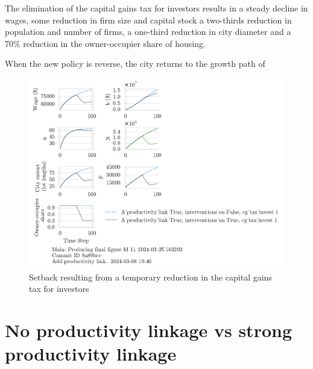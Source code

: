 The elimination of the capital gains tax for investors results in a steady decline in wages, some reduction in firm size and capital stock a two-thirds reduction in population and number of firms,  a one-third reduction in city diameter and a 70\% reduction in the owner-occupier share of housing.

When the new policy is reverse, the city returns to  the growth path of 

\begin{figure}[h!tb] 
    \centering
    \includegraphics[scale=1.15, trim={0 1.4cm 6.5cm 0},clip]{fig/interventions_on-cg_tax_invest-163203.pdf}  %
    \caption{Setback resulting from a temporary reduction in the capital gains tax for investors}
    \label{fig:cgtax_setback}
\end{figure}



\section{No productivity linkage vs strong productivity linkage }

\newpage
